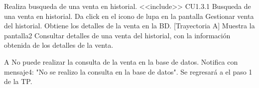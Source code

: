 
\begin{UCtrayectoria}
		
	\UCpaso [\UCactor]  Realiza busqueda de una venta en historial. <<include>> CU1.3.1 Busqueda de una venta en historial.
	\UCpaso [\UCactor]  Da click en el icono de lupa en la pantalla Gestionar venta del historial. 
	\UCpaso [\UCsist] Obtiene los detalles de la venta en la BD. [Trayectoria A]
	\UCpaso [\UCsist] Muestra la pantalla2 Consultar detalles de una venta del historial, con la información obtenida de los detalles de la venta.
	
\end{UCtrayectoria}


\begin{UCtrayectoriaA}{A}{ No puede realizar la consulta de la venta en la base de datos.}
	\UCpaso [\UCsist] Notifica con mensaje4: "No se realizo la consulta en la base de datos".
	\UCpaso [\UCsist] Se regresará a el paso 1 de la TP.
\end{UCtrayectoriaA}